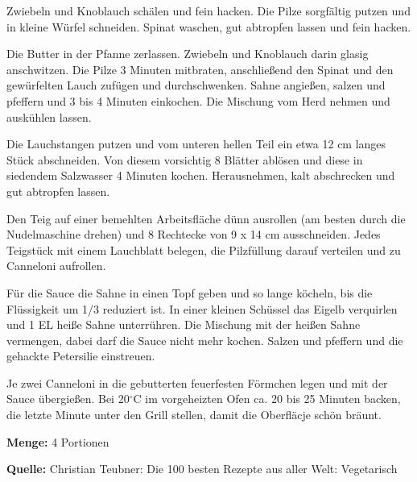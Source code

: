{Zwiebeln und Knoblauch schälen und fein hacken. Die Pilze sorgfältig putzen und in kleine Würfel schneiden. Spinat waschen, gut abtropfen lassen und fein hacken.

Die Butter in der Pfanne zerlassen. Zwiebeln und Knoblauch darin glasig anschwitzen. Die Pilze 3 Minuten mitbraten, anschließend den Spinat und den gewürfelten Lauch zufügen und durchschwenken. Sahne angießen, salzen und pfeffern und 3 bis 4 Minuten einkochen. Die Mischung vom Herd nehmen und auskühlen lassen.

Die Lauchstangen putzen und vom unteren hellen Teil ein etwa 12 cm langes Stück abschneiden. Von diesem vorsichtig 8 Blätter ablösen und diese in siedendem Salzwasser 4 Minuten kochen. Herausnehmen, kalt abschrecken und gut abtropfen lassen.

Den Teig auf einer bemehlten Arbeitsfläche dünn ausrollen (am besten durch die Nudelmaschine drehen) und 8 Rechtecke von 9 x 14 cm ausschneiden. Jedes Teigstück mit einem Lauchblatt belegen, die Pilzfüllung darauf verteilen und zu Canneloni aufrollen.

Für die Sauce die Sahne in einen Topf geben und so lange köcheln, bis die Flüssigkeit um 1/3 reduziert ist. In einer kleinen Schüssel das Eigelb verquirlen und 1 EL heiße Sahne unterrühren. Die Mischung mit der heißen Sahne vermengen, dabei darf die Sauce nicht mehr kochen. Salzen und pfeffern und die gehackte Petersilie einstreuen.

Je zwei Canneloni in die gebutterten feuerfesten Förmchen legen und mit der Sauce übergießen. Bei 20$^\circ$C im vorgeheizten Ofen ca. 20 bis 25 Minuten backen, die letzte Minute unter den Grill stellen, damit die Oberfläcje schön bräunt.


{\bfseries Menge:} 4 Portionen

{\bfseries Quelle:} Christian Teubner: Die 100 besten Rezepte aus aller Welt: Vegetarisch 

} 

